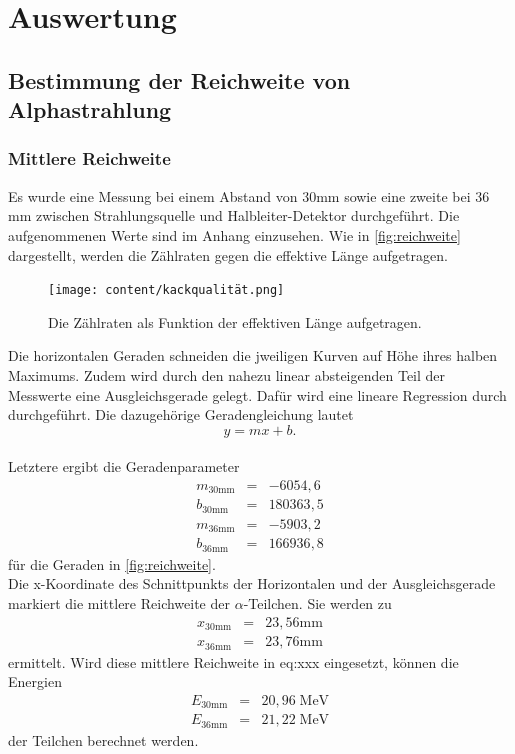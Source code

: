 \section{Auswertung}
\label{sec:Auswertung}

\subsection{Bestimmung der Reichweite von Alphastrahlung}
\subsubsection*{Mittlere Reichweite}
Es wurde eine Messung bei einem Abstand von $30$mm sowie eine zweite bei $36$mm zwischen 
Strahlungsquelle und Halbleiter-Detektor durchgeführt. 
Die aufgenommenen Werte sind im Anhang einzusehen.
Wie in \autoref{fig:reichweite} dargestellt, werden die Zählraten gegen die effektive Länge 
aufgetragen.\\
\begin{figure}[H]
  \centering
  \texttt{[image: content/kackqualität.png]}
  \caption{Die Zählraten als Funktion der effektiven Länge aufgetragen.}
  \label{fig:reichweite}
\end{figure}
Die horizontalen Geraden schneiden die jweiligen Kurven auf Höhe ihres halben
Maximums. Zudem wird durch den nahezu linear absteigenden Teil der Messwerte eine 
Ausgleichsgerade gelegt. Dafür wird eine lineare Regression durch \cite{numpy} durchgeführt. Die 
dazugehörige Geradengleichung lautet
\begin{equation}
  y = mx + b.
  \label{eq:linreg}
\end{equation}\\
Letztere ergibt die Geradenparameter
\begin{eqnarray}
  m_{\mathrm{30mm}} &=&  -6054,6  \nonumber  \\
  b_{\mathrm{30mm}} &=&  180363,5 \nonumber  \\
  m_{\mathrm{36mm}} &=&  -5903,2  \nonumber  \\
  b_{\mathrm{36mm}} &=&  166936,8 \nonumber
\end{eqnarray}
für die Geraden in \autoref{fig:reichweite}.\\
Die x-Koordinate des Schnittpunkts der Horizontalen und der Ausgleichsgerade markiert die 
mittlere Reichweite der $\alpha$-Teilchen. 
Sie werden zu 
\begin{eqnarray}
  x_{\mathrm{30mm}} &=& 23,56 \mathrm{mm} \nonumber  \\
  x_{\mathrm{36mm}} &=& 23,76 \mathrm{mm} \nonumber  
\end{eqnarray}
ermittelt.
Wird diese mittlere Reichweite in eq:xxx eingesetzt, können die Energien 
\begin{eqnarray}
  E_{\mathrm{30mm}} &=& 20,96 \; \mathrm{MeV} \nonumber  \\
  E_{\mathrm{36mm}} &=& 21,22 \; \mathrm{MeV} \nonumber  
\end{eqnarray}
der Teilchen berechnet werden. 



